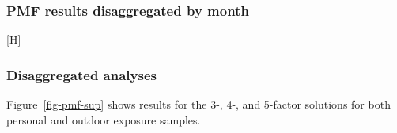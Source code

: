\documentclass[
  letterpaper,
  DIV=11,
  numbers=noendperiod]{scrartcl}
\makeatletter
\renewenvironment{figure}%
   {\renewcommand\familydefault\sfdefault
    \@float{figure}}
   {\end@float}
\makeatother
\begin{document}
\subsubsection{PMF results disaggregated by
month}\label{pmf-results-disaggregated-by-month}

\begin{figure}[H]

\caption{\label{fig-pmf-sup-month}Mass concentrations (ug/m3) of
contributions to PM2.5 mass by each of the four named sources identified
in the source analysis. From left to right, the source contributions
represented are `sulfur secondary', `mixed combustion', `dust', and
`transported dust'. Source contribution mass concentrations are shown by
month (November, December, January) and color-coded by district, with
purple for Fangshan, blue for Huairou, green for Mentougou, and yellow
for Miyun.}


\end{figure}%

\subsubsection{Disaggregated analyses}\label{disaggregated-analyses}

Figure~\ref{fig-pmf-sup} shows results for the 3-, 4-, and 5-factor
solutions for both personal and outdoor exposure samples.
\end{document}
